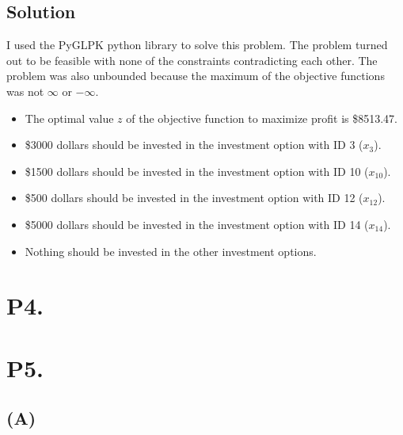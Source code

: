 \documentclass[12pt]{article}
\begin{document}
\subsection*{}

\subsection*{Solution}
I used the PyGLPK python library to solve this problem.  The problem turned out to be feasible with none of the constraints contradicting each other.  The problem was also unbounded because the maximum of the objective functions was not $\infty$ or $-\infty$.\\ 
\begin{itemize}
  \item The optimal value $z$ of the objective function to maximize profit is \$8513.47.
  \item \$3000 dollars should be invested in the investment option with ID 3 ($x_{3}$).
  \item \$1500 dollars should be invested in the investment option with ID 10 ($x_{10}$).
  \item \$500 dollars should be invested in the investment option with ID 12 ($x_{12}$).
  \item \$5000 dollars should be invested in the investment option with ID 14 ($x_{14}$).
  \item Nothing should be invested in the other investment options.
\end{itemize}
\newpage
\section*{P4.}

\newpage

\section*{P5.}
\subsection*{(A)}
\end{document}
